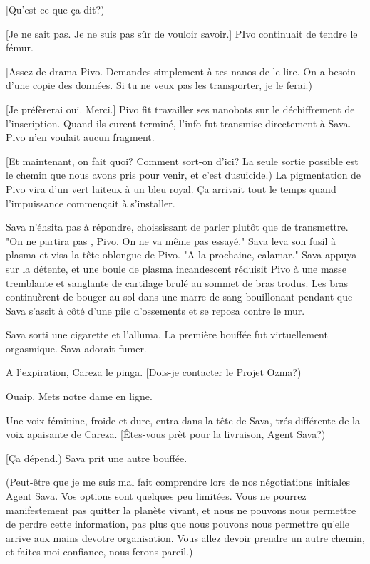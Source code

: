 [Qu'est-ce que ça dit?) 

[Je ne sait pas. Je ne suis pas sûr de vouloir savoir.] PIvo continuait de tendre le fémur. 

[Assez de drama Pivo. Demandes simplement à tes nanos de le lire. On a besoin d'une copie des données. Si tu ne veux pas les transporter, je le ferai.) 

[Je préfèrerai oui. Merci.] Pivo fit travailler ses nanobots  sur le déchiffrement de l'inscription. Quand ils eurent terminé, l'info fut transmise directement à Sava. Pivo n'en voulait aucun fragment. 

[Et maintenant, on fait quoi? Comment sort-on d'ici? La seule sortie possible est le chemin que nous avons pris pour venir, et c'est dusuicide.) La pigmentation de Pivo vira d'un vert laiteux à un bleu royal. Ça arrivait tout le temps quand l'impuissance commençait à s'installer. 

Sava n'éhsita pas à répondre, choississant de parler plutôt que de transmettre. "On ne partira pas , Pivo. On ne va même pas essayé." Sava leva son fusil à plasma et visa la tête oblongue de Pivo. "A la prochaine, calamar." Sava appuya sur la détente, et une boule de plasma incandescent réduisit Pivo à une masse tremblante et sanglante de  cartilage brulé au sommet de bras trodus. Les bras continuèrent de bouger au sol dans une marre de sang bouillonant pendant que Sava s'assit à côté d'une pile d'ossements et se reposa contre le mur. 

Sava sorti une cigarette et l'alluma. La première bouffée fut virtuellement orgasmique. Sava adorait fumer. 

A l'expiration, Careza le pinga. [Dois-je contacter le Projet Ozma?) 

Ouaip. Mets notre dame en ligne. 

Une voix féminine, froide et dure, entra dans la tête de Sava, trés différente de la voix apaisante de Careza. [Êtes-vous prèt pour la livraison, Agent Sava?) 

[Ça dépend.) Sava prit une autre bouffée. 

(Peut-être que je me suis mal fait comprendre lors de nos négotiations initiales Agent Sava. Vos options sont quelques peu limitées. Vous ne pourrez manifestement pas quitter la planète vivant, et nous ne pouvons nous permettre de perdre cette information, pas plus que nous pouvons nous permettre qu'elle arrive aux mains devotre organisation. Vous allez devoir prendre un autre chemin, et faites moi confiance, nous ferons pareil.) 

